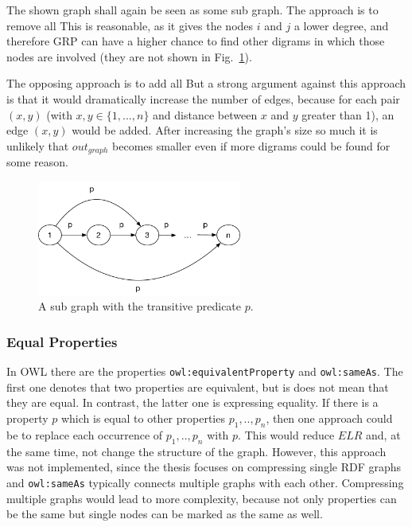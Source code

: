 The shown graph shall again be seen as some sub graph. The approach is to remove all \dtpsp This is reasonable, as it gives the nodes $i$ and $j$ a lower degree, and therefore GRP can have a higher chance to find other digrams in which those nodes are involved (they are not shown in Fig.~\ref{fig:transitiveMat}). 

The opposing approach is to add all \dtpsp But a strong argument against this approach is that it would dramatically increase the number of edges, because for each pair $(x,y)$ (with $x,y\in \{1,...,n\} $  and distance between $x$ and $y$ greater than 1), an edge $(x,y)$ would be added. After increasing the graph's size so much it is unlikely that $out_{graph}$ becomes smaller even if more digrams could be found for some reason. 

\begin{figure}[h]
	\centering
	\includegraphics[width=0.6\textwidth]{figures/approach/transitiveMat}
	\caption{A sub graph with the transitive predicate $p$.}
	\label{fig:transitiveMat}
\end{figure}


\subsubsection{Equal Properties}\label{sec:approachEqualProperties}

In OWL there are the properties {\tt owl:equivalentProperty} and {\tt owl:sameAs}. The first one denotes that two properties are equivalent, but is does not mean that they are equal. In contrast, the latter one is expressing equality. If there is a property $p$ which is equal to other properties $p_1,..,p_n$, then one approach could be to replace each occurrence of $p_1,..,p_n$ with $p$. This would reduce $ELR$ and, at the same time, not change the structure of the graph. However, this approach was not implemented, since the thesis focuses on compressing single RDF graphs and {\tt owl:sameAs} typically connects multiple graphs with each other. Compressing multiple graphs would lead to more complexity, because not only properties can be the same but single nodes can be marked as the same as well.


